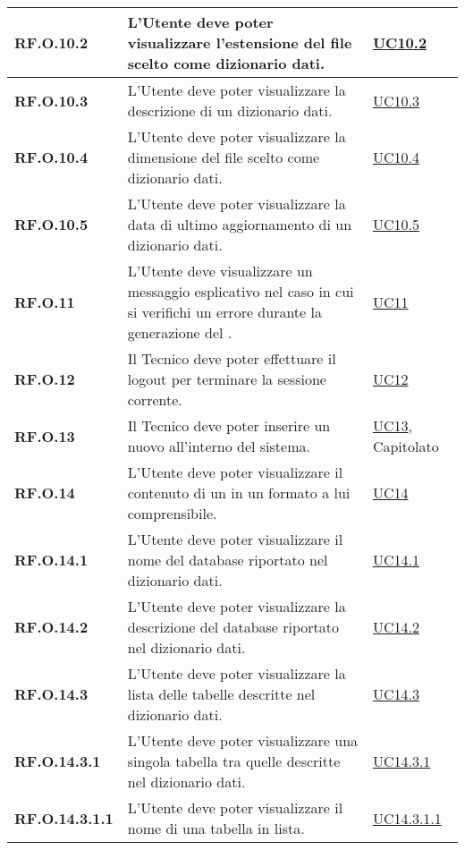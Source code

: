 \begin{adjustwidth}{-0.5cm}{-0.5cm}
\begin{longtable}{|P{3cm}|P{6,5cm}|>{\arraybackslash}P{4cm}|}
    \hline
    \textbf{RF.O.10.2} & L'Utente deve poter visualizzare l'estensione del file scelto come dizionario dati. & \hyperref[UC10point2]{UC10.2}\\
    \hline
    \textbf{RF.O.10.3} & L'Utente deve poter visualizzare la descrizione di un dizionario dati. & \hyperref[UC10point3]{UC10.3}\\
    \hline
    \textbf{RF.O.10.4} & L'Utente deve poter visualizzare la dimensione del file scelto come dizionario dati. & \hyperref[UC10point4]{UC10.4}\\
    \hline
    \textbf{RF.O.10.5} & L'Utente deve poter visualizzare la data di ultimo aggiornamento di un dizionario dati. & \hyperref[UC10point5]{UC10.5}\\
    \hline
    \textbf{RF.O.11} & L'Utente deve visualizzare un messaggio esplicativo nel caso in cui si verifichi un errore durante la generazione del . & \hyperref[UC11]{UC11}\\
    \hline
    \textbf{RF.O.12} & Il Tecnico deve poter effettuare il logout per terminare la sessione corrente. & \hyperref[UC12]{UC12}\\
    \hline
    \textbf{RF.O.13} & Il Tecnico deve poter inserire un nuovo  all'interno del sistema. & \hyperref[UC13]{UC13}, Capitolato\\
    \hline
    \textbf{RF.O.14} & L'Utente deve poter visualizzare il contenuto di un  in un formato a lui comprensibile. & \hyperref[UC14]{UC14}\\
    \hline
    \textbf{RF.O.14.1} & L'Utente deve poter visualizzare il nome del database riportato nel dizionario dati. & \hyperref[UC14point1]{UC14.1}\\
    \hline
    \textbf{RF.O.14.2} & L'Utente deve poter visualizzare la descrizione del database riportato nel dizionario dati. & \hyperref[UC14point2]{UC14.2}\\
    \hline
    \textbf{RF.O.14.3} & L'Utente deve poter visualizzare la lista delle tabelle descritte nel dizionario dati. & \hyperref[UC14point3]{UC14.3}\\
    \hline
    \textbf{RF.O.14.3.1} & L'Utente deve poter visualizzare una singola tabella tra quelle descritte nel dizionario dati. & \hyperref[UC14point3point1]{UC14.3.1}\\
    \hline
    \textbf{RF.O.14.3.1.1} & L'Utente deve poter visualizzare il nome di una tabella in lista. & \hyperref[UC14point3point1point1]{UC14.3.1.1}\\

\end{longtable}
\end{adjustwidth}
